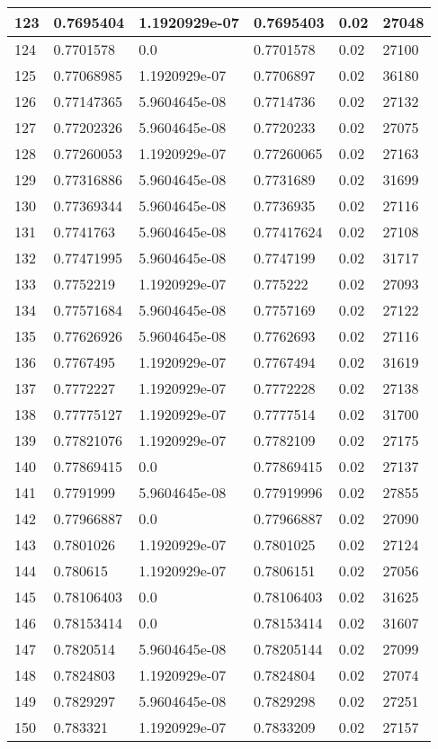 \begin{longtable}{|l|l|l|l|l|l|}
123 & 0.7695404 & 1.1920929e-07 & 0.7695403 & 0.02 & 27048 \\ \hline 
124 & 0.7701578 & 0.0 & 0.7701578 & 0.02 & 27100 \\ \hline 
125 & 0.77068985 & 1.1920929e-07 & 0.7706897 & 0.02 & 36180 \\ \hline 
126 & 0.77147365 & 5.9604645e-08 & 0.7714736 & 0.02 & 27132 \\ \hline 
127 & 0.77202326 & 5.9604645e-08 & 0.7720233 & 0.02 & 27075 \\ \hline 
128 & 0.77260053 & 1.1920929e-07 & 0.77260065 & 0.02 & 27163 \\ \hline 
129 & 0.77316886 & 5.9604645e-08 & 0.7731689 & 0.02 & 31699 \\ \hline 
130 & 0.77369344 & 5.9604645e-08 & 0.7736935 & 0.02 & 27116 \\ \hline 
131 & 0.7741763 & 5.9604645e-08 & 0.77417624 & 0.02 & 27108 \\ \hline 
132 & 0.77471995 & 5.9604645e-08 & 0.7747199 & 0.02 & 31717 \\ \hline 
133 & 0.7752219 & 1.1920929e-07 & 0.775222 & 0.02 & 27093 \\ \hline 
134 & 0.77571684 & 5.9604645e-08 & 0.7757169 & 0.02 & 27122 \\ \hline 
135 & 0.77626926 & 5.9604645e-08 & 0.7762693 & 0.02 & 27116 \\ \hline 
136 & 0.7767495 & 1.1920929e-07 & 0.7767494 & 0.02 & 31619 \\ \hline 
137 & 0.7772227 & 1.1920929e-07 & 0.7772228 & 0.02 & 27138 \\ \hline 
138 & 0.77775127 & 1.1920929e-07 & 0.7777514 & 0.02 & 31700 \\ \hline 
139 & 0.77821076 & 1.1920929e-07 & 0.7782109 & 0.02 & 27175 \\ \hline 
140 & 0.77869415 & 0.0 & 0.77869415 & 0.02 & 27137 \\ \hline 
141 & 0.7791999 & 5.9604645e-08 & 0.77919996 & 0.02 & 27855 \\ \hline 
142 & 0.77966887 & 0.0 & 0.77966887 & 0.02 & 27090 \\ \hline 
143 & 0.7801026 & 1.1920929e-07 & 0.7801025 & 0.02 & 27124 \\ \hline 
144 & 0.780615 & 1.1920929e-07 & 0.7806151 & 0.02 & 27056 \\ \hline 
145 & 0.78106403 & 0.0 & 0.78106403 & 0.02 & 31625 \\ \hline 
146 & 0.78153414 & 0.0 & 0.78153414 & 0.02 & 31607 \\ \hline 
147 & 0.7820514 & 5.9604645e-08 & 0.78205144 & 0.02 & 27099 \\ \hline 
148 & 0.7824803 & 1.1920929e-07 & 0.7824804 & 0.02 & 27074 \\ \hline 
149 & 0.7829297 & 5.9604645e-08 & 0.7829298 & 0.02 & 27251 \\ \hline 
150 & 0.783321 & 1.1920929e-07 & 0.7833209 & 0.02 & 27157 \\ \hline 
\end{longtable}